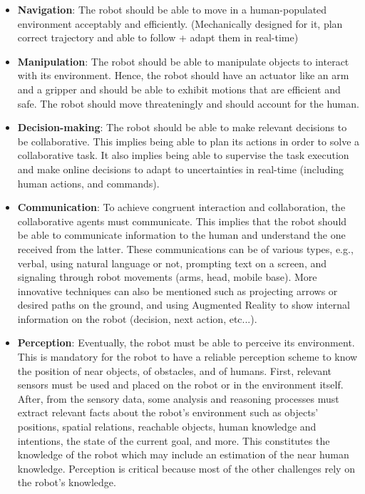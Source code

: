 \begin{itemize}
    \item \textbf{Navigation}: The robot should be able to move in a human-populated environment acceptably and efficiently. (Mechanically designed for it, plan correct trajectory and able to follow + adapt them in real-time)

    \item \textbf{Manipulation}: The robot should be able to manipulate objects to interact with its environment. Hence, the robot should have an actuator like an arm and a gripper and should be able to exhibit motions that are efficient and safe. The robot should move threateningly and should account for the human.

    \item \textbf{Decision-making}: The robot should be able to make relevant decisions to be collaborative. This implies being able to plan its actions in order to solve a collaborative task. It also implies being able to supervise the task execution and make online decisions to adapt to uncertainties in real-time (including human actions, and commands). 

    \item \textbf{Communication}: To achieve congruent interaction and collaboration, the collaborative agents must communicate. This implies that the robot should be able to communicate information to the human and understand the one received from the latter. These communications can be of various types, e.g., verbal, using natural language or not, prompting text on a screen, and signaling through robot movements (arms, head, mobile base). More innovative techniques can also be mentioned such as projecting arrows or desired paths on the ground, and using Augmented Reality to show internal information on the robot (decision, next action, etc...).

    \item \textbf{Perception}: Eventually, the robot must be able to perceive its environment. This is mandatory for the robot to have a reliable perception scheme to know the position of near objects, of obstacles, and of humans. First, relevant sensors must be used and placed on the robot or in the environment itself. After, from the sensory data, some analysis and reasoning processes must extract relevant facts about the robot's environment such as objects' positions, spatial relations, reachable objects, human knowledge and intentions, the state of the current goal, and more. This constitutes the knowledge of the robot which may include an estimation of the near human knowledge. Perception is critical because most of the other challenges rely on the robot's knowledge.

\end{itemize}
    

